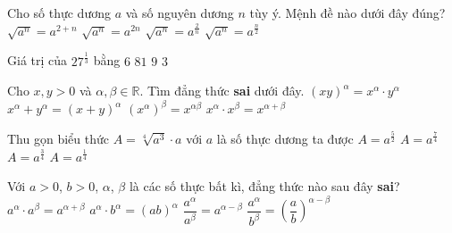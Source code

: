 \begin{ex}%
	Cho số thực dương $a$ và số nguyên dương $n$ tùy ý. Mệnh đề nào dưới đây  đúng?
	\choice 
		 {$\sqrt{a^n}=a^{2+n}$}
		{$\sqrt{a^n}=a^{2n}$} 
		 {$\sqrt{a^n}=a^{\tfrac{2}{n}}$}
		{\True $\sqrt{a^n}=a^{\tfrac{n}{2}}$} 
\end{ex}

\begin{ex}%
	Giá trị của  $27^{\tfrac{1}{3}}$ bằng
	\choice 
		{$6$} 
		 {$81$}
		 {$9$}
		 {\True $3$}
\end{ex}

\begin{ex}%
	Cho $x,y>0$ và $\alpha, \beta \in \mathbb{R}$. Tìm đẳng thức \textbf{sai} dưới đây. 
	 \choice
		 {$(xy)^{\alpha}=x^{\alpha} \cdot y^{\alpha}$}
		{\True  $x^{\alpha}+y^{\alpha}=(x+y)^{\alpha}$}
		{$(x^{\alpha})^{\beta}=x^{\alpha \beta}$} 
		 {$x^{\alpha} \cdot x^{\beta}=x^{\alpha + \beta}$}
\end{ex}

\begin{ex}%
	Thu gọn  biểu thức $A=\sqrt[4]{a^3} \cdot a$ với $a$ là số thực dương ta được
	\choice 
		 {$A=a^{\tfrac{5}{2}}$}
		{\True  $A=a^{\tfrac{7}{4}}$}
		 {$A=a^{\tfrac{3}{4}}$}
		 {$A=a^{\tfrac{1}{4}}$}
\end{ex}

\begin{ex}%
	Với $a>0$, $b> 0$, $\alpha$, $\beta$ là các số  thực bất kì, đẳng thức nào sau đây \textbf{sai}?
	 \choice
		 {$a^{\alpha}\cdot a^{\beta}=a^{\alpha+\beta}$}
		{$a^{\alpha}\cdot b^{\alpha}=\left(ab\right)^{\alpha}$} 
		{$\dfrac{a^{\alpha}}{a^{\beta}}=a^{\alpha-\beta}$} 
		{\True $\dfrac{a^{\alpha}}{b^{\beta}}=\left(\dfrac{a}{b}\right)^{\alpha-\beta}$} 
\end{ex}


